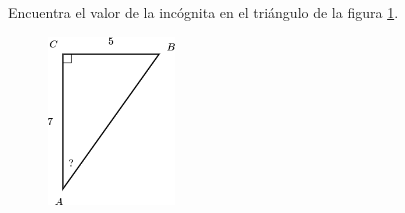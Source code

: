 Encuentra el valor de la incógnita en el triángulo de la figura \ref{fig:angle_functrig_30}.
\begin{figure}[H]
    \begin{center}
        \includegraphics[width=0.3\textwidth]{../images/angle_functrig_30.png}
    \end{center}
    \caption{}
    \label{fig:angle_functrig_30}
\end{figure}